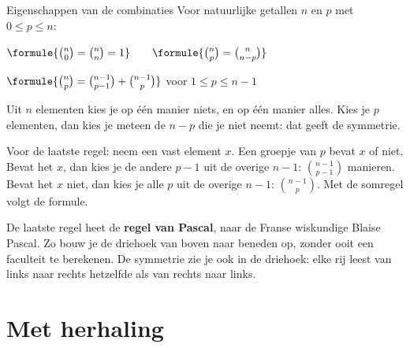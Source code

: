 \begin{theorie}
\begin{stelling}{Eigenschappen van de combinaties}
Voor natuurlijke getallen $n$ en $p$ met $0 \leqslant p \leqslant n$:

\vspace{1mm}
\qquad $\formule{\binom{n}{0} = \binom{n}{n} = 1} \qquad \formule{\binom{n}{p} = \binom{n}{n - p}}$

\vspace{1mm}
\qquad $\formule{\binom{n}{p} = \binom{n - 1}{p - 1} + \binom{n - 1}{p}}$ \quad voor $1 \leqslant p \leqslant n - 1$
\end{stelling}

\begin{bewijs}
Uit $n$ elementen kies je op één manier niets, en op één manier alles. Kies je $p$ elementen, dan kies je meteen de $n - p$ die je niet neemt: dat geeft de symmetrie.\par
Voor de laatste regel: neem een vast element $x$. Een groepje van $p$ bevat $x$ of niet. Bevat het $x$, dan kies je de andere $p - 1$ uit de overige $n - 1$: $\binom{n - 1}{p - 1}$ manieren. Bevat het $x$ niet, dan kies je alle $p$ uit de overige $n - 1$: $\binom{n - 1}{p}$. Met de somregel volgt de formule.
\end{bewijs}
\end{theorie}

De laatste regel heet de \textbf{regel van Pascal}, naar de Franse wiskundige Blaise Pascal. Zo bouw je de driehoek van boven naar beneden op, zonder ooit een faculteit te berekenen. De symmetrie zie je ook in de driehoek: elke rij leest van links naar rechts hetzelfde als van rechts naar links.


\begin{oefeningen}

\end{oefeningen}

\section{Met herhaling}

